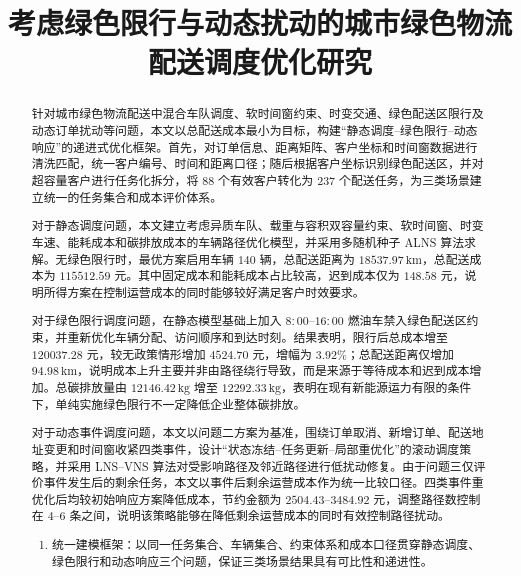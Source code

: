 \documentclass[withoutpreface,bwprint]{cumcmthesis} %
\title{考虑绿色限行与动态扰动的城市绿色物流配送调度优化研究}  %
\begin{document}

\maketitle

\begin{abstract}

针对城市绿色物流配送中混合车队调度、软时间窗约束、时变交通、绿色配送区限行及动态订单扰动等问题，本文以{\heiti 总配送成本最小}为目标，构建{\heiti “静态调度--绿色限行--动态响应”}的递进式优化框架。首先，对订单信息、距离矩阵、客户坐标和时间窗数据进行清洗匹配，统一客户编号、时间和距离口径；随后根据客户坐标识别绿色配送区，并对超容量客户进行任务化拆分，将 $88$ 个有效客户转化为 $237$ 个配送任务，为三类场景建立统一的任务集合和成本评价体系。

对于{\heiti 静态调度问题}，本文建立考虑{\heiti 异质车队、载重与容积双容量约束、软时间窗、时变车速、能耗成本和碳排放成本}的车辆路径优化模型，并采用多随机种子 {\heiti ALNS} 算法求解。无绿色限行时，最优方案启用车辆 $140$ 辆，总配送距离为 $18537.97\,\mathrm{km}$，总配送成本为 $115512.59$ 元。其中固定成本和能耗成本占比较高，迟到成本仅为 $148.58$ 元，说明所得方案在控制运营成本的同时能够较好满足客户时效要求。

对于{\heiti 绿色限行调度问题}，在静态模型基础上加入 $8{:}00$--$16{:}00$ 燃油车禁入绿色配送区约束，并重新优化车辆分配、访问顺序和到达时刻。结果表明，限行后总成本增至 $120037.28$ 元，较无政策情形增加 $4524.70$ 元，增幅为 $3.92\%$；总配送距离仅增加 $94.98\,\mathrm{km}$，说明成本上升主要并非由路径绕行导致，而是来源于等待成本和迟到成本增加。总碳排放量由 $12146.42\,\mathrm{kg}$ 增至 $12292.33\,\mathrm{kg}$，表明在现有新能源运力有限的条件下，{\heiti 单纯实施绿色限行不一定降低企业整体碳排放}。

对于{\heiti 动态事件调度问题}，本文以问题二方案为基准，围绕订单取消、新增订单、配送地址变更和时间窗收紧四类事件，设计{\heiti “状态冻结--任务更新--局部重优化”}的滚动调度策略，并采用 {\heiti LNS--VNS} 算法对受影响路径及邻近路径进行低扰动修复。由于问题三仅评价事件发生后的剩余任务，本文以事件后剩余运营成本作为统一比较口径。四类事件重优化后均较初始响应方案降低成本，节约金额为 $2504.43$--$3484.92$ 元，调整路径数控制在 $4$--$6$ 条之间，说明该策略能够在{\heiti 降低剩余运营成本}的同时有效控制路径扰动。

\vspace{0.3em}
\begin{enumerate}[leftmargin=2em,itemsep=0.06em,topsep=0.15em,parsep=0pt]
    \item {\heiti 统一建模框架：}以同一任务集合、车辆集合、约束体系和成本口径贯穿静态调度、绿色限行和动态响应三个问题，保证三类场景结果具有可比性和递进性。


\end{enumerate}
\end{abstract}
\end{document}
